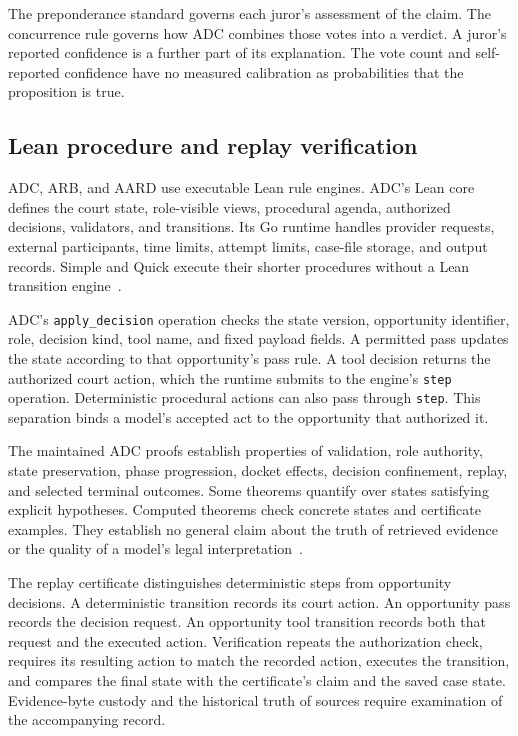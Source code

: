 \documentclass[11pt]{article}
\newcommand{\code}[1]{\texttt{#1}}
\begin{document}
The preponderance standard governs each juror's assessment of the claim.  The concurrence rule governs how ADC combines those votes into a verdict.  A juror's reported confidence is a further part of its explanation.  The vote count and self-reported confidence have no measured calibration as probabilities that the proposition is true.

\subsection{Lean procedure and replay verification}

ADC, ARB, and AARD use executable Lean rule engines.  ADC's Lean core defines the court state, role-visible views, procedural agenda, authorized decisions, validators, and transitions.  Its Go runtime handles provider requests, external participants, time limits, attempt limits, case-file storage, and output records.  Simple and Quick execute their shorter procedures without a Lean transition engine~\cite{logic,proofs}.

ADC's \code{apply\_decision} operation checks the state version, opportunity identifier, role, decision kind, tool name, and fixed payload fields.  A permitted pass updates the state according to that opportunity's pass rule.  A tool decision returns the authorized court action, which the runtime submits to the engine's \code{step} operation.  Deterministic procedural actions can also pass through \code{step}.  This separation binds a model's accepted act to the opportunity that authorized it.

The maintained ADC proofs establish properties of validation, role authority, state preservation, phase progression, docket effects, decision confinement, replay, and selected terminal outcomes.  Some theorems quantify over states satisfying explicit hypotheses.  Computed theorems check concrete states and certificate examples.  They establish no general claim about the truth of retrieved evidence or the quality of a model's legal interpretation~\cite{proofs}.

The replay certificate distinguishes deterministic steps from opportunity decisions.  A deterministic transition records its court action.  An opportunity pass records the decision request.  An opportunity tool transition records both that request and the executed action.  Verification repeats the authorization check, requires its resulting action to match the recorded action, executes the transition, and compares the final state with the certificate's claim and the saved case state.  Evidence-byte custody and the historical truth of sources require examination of the accompanying record.
\end{document}
